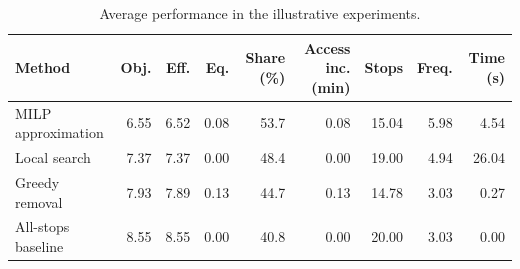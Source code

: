 \begin{table}[htbp]
\centering
\small
\caption{Average performance in the illustrative experiments.}
\label{tab:illustrative_summary}
\begin{tabular}{lrrrrrrrr}
\toprule
Method & Obj. & Eff. & Eq. & Share (\%) & Access inc. (min) & Stops & Freq. & Time (s) \\
\midrule
MILP approximation & 6.55 & 6.52 & 0.08 & 53.7 & 0.08 & 15.04 & 5.98 & 4.54 \\
Local search & 7.37 & 7.37 & 0.00 & 48.4 & 0.00 & 19.00 & 4.94 & 26.04 \\
Greedy removal & 7.93 & 7.89 & 0.13 & 44.7 & 0.13 & 14.78 & 3.03 & 0.27 \\
All-stops baseline & 8.55 & 8.55 & 0.00 & 40.8 & 0.00 & 20.00 & 3.03 & 0.00 \\
\bottomrule
\end{tabular}
\end{table}

